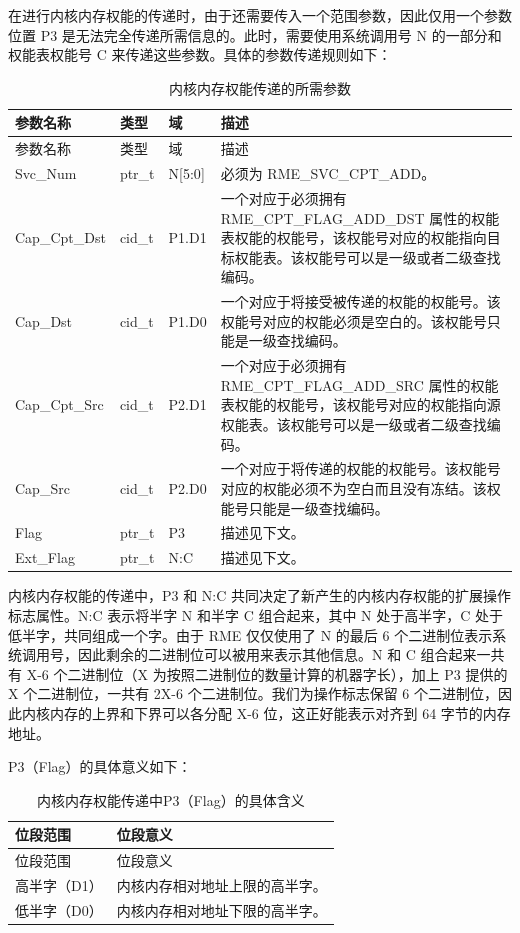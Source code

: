 在进行内核内存权能的传递时，由于还需要传入一个范围参数，因此仅用一个参数位置 P3 是无法完全传递所需信息的。此时，需要使用系统调用号 N 的一部分和权能表权能号 C 来传递这些参数。具体的参数传递规则如下：

\begin{xltabular}{\textwidth}{@{}>{\hsize\raggedright\arraybackslash}X>{\hsize\raggedright\arraybackslash}X>{\hsize\raggedright\arraybackslash}X>{\hsize\raggedright\arraybackslash}X@{}}
\caption{内核内存权能传递的所需参数}\label{tab:3-23-kernel-memory-capability-transfer-parameters}\\
\toprule
参数名称 & 类型 & 域 & 描述\tabularnewline
\endfirsthead
\toprule
参数名称 & 类型 & 域 & 描述\tabularnewline
\midrule
\endhead
\bottomrule
\endlastfoot
Svc\_Num & ptr\_t & N{[}5:0{]} & 必须为 RME\_SVC\_CPT\_ADD。\tabularnewline
Cap\_Cpt\_Dst & cid\_t & P1.D1 &
一个对应于必须拥有 RME\_CPT\_FLAG\_ADD\_DST 属性的权能表权能的权能号，该权能号对应的权能指向目标权能表。该权能号可以是一级或者二级查找编码。\tabularnewline
Cap\_Dst & cid\_t & P1.D0 &
一个对应于将接受被传递的权能的权能号。该权能号对应的权能必须是空白的。该权能号只能是一级查找编码。\tabularnewline
Cap\_Cpt\_Src & cid\_t & P2.D1 &
一个对应于必须拥有 RME\_CPT\_FLAG\_ADD\_SRC 属性的权能表权能的权能号，该权能号对应的权能指向源权能表。该权能号可以是一级或者二级查找编码。\tabularnewline
Cap\_Src & cid\_t & P2.D0 &
一个对应于将传递的权能的权能号。该权能号对应的权能必须不为空白而且没有冻结。该权能号只能是一级查找编码。\tabularnewline
Flag & ptr\_t & P3 & 描述见下文。\tabularnewline
Ext\_Flag & ptr\_t & N:C & 描述见下文。\tabularnewline
\end{xltabular}

内核内存权能的传递中，P3 和 N:C 共同决定了新产生的内核内存权能的扩展操作标志属性。N:C 表示将半字 N 和半字 C 组合起来，其中 N 处于高半字，C 处于低半字，共同组成一个字。由于 RME 仅仅使用了 N 的最后 6 个二进制位表示系统调用号，因此剩余的二进制位可以被用来表示其他信息。N 和 C 组合起来一共有 X-6 个二进制位（X 为按照二进制位的数量计算的机器字长），加上 P3 提供的 X 个二进制位，一共有 2X-6 个二进制位。我们为操作标志保留 6 个二进制位，因此内核内存的上界和下界可以各分配 X-6 位，这正好能表示对齐到 64 字节的内存地址。

P3（Flag）的具体意义如下：

\begin{xltabular}{\textwidth}{@{}>{\hsize\raggedright\arraybackslash}X>{\hsize\raggedright\arraybackslash}X@{}}
\caption{内核内存权能传递中P3（Flag）的具体含义}\label{tab:3-24-kernel-memory-p3-flag-meaning}\\
\toprule
位段范围 & 位段意义\tabularnewline
\endfirsthead
\toprule
位段范围 & 位段意义\tabularnewline
\midrule
\endhead
\bottomrule
\endlastfoot
高半字（D1） & 内核内存相对地址上限的高半字。\tabularnewline
低半字（D0） & 内核内存相对地址下限的高半字。\tabularnewline
\end{xltabular}

